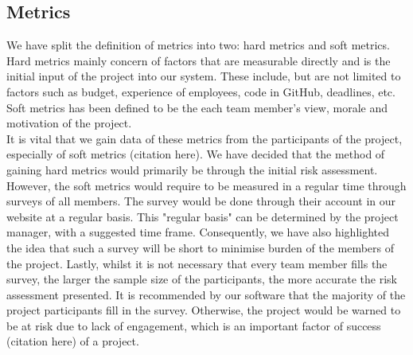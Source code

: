 \documentclass[a4paper]{article}
\theoremstyle{plain}
\theoremstyle{definition}
\theoremstyle{remark}
\begin{document}
\subsection{Metrics}
We have split the definition of metrics into two: hard metrics and soft metrics. Hard metrics mainly concern of factors that are measurable directly and is the initial input of the project into our system. These include, but are not limited to factors such as budget, experience of employees, code in GitHub, deadlines, etc. Soft metrics has been defined to be the each team member's view, morale and motivation of the project. \\

\noindent It is vital that we gain data of these metrics from the participants of the project, especially of soft metrics (citation here). We have decided that the method of gaining hard metrics would primarily be through the initial risk assessment. However, the soft metrics would require to be measured in a regular time through surveys of all members. The survey would be done through their account in our website at a regular basis. This "regular basis" can be determined by the project manager, with a suggested time frame. Consequently, we have also highlighted the idea that such a survey will be short to minimise burden of the members of the project. Lastly, whilst it is not necessary that every team member fills the survey, the larger the sample size of the participants, the more accurate the risk assessment presented. It is recommended by our software that the majority of the project participants fill in the survey. Otherwise, the project would be warned to be at risk due to lack of engagement, which is an important factor of success (citation here) of a project. \\
\end{document}
